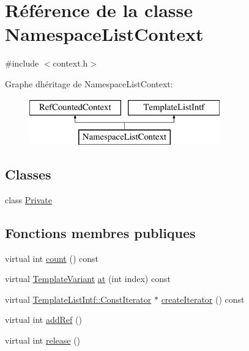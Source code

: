 \hypertarget{class_namespace_list_context}{}\section{Référence de la classe Namespace\+List\+Context}
\label{class_namespace_list_context}


{\ttfamily \#include $<$context.\+h$>$}

Graphe d\textquotesingle{}héritage de Namespace\+List\+Context\+:\begin{figure}[H]
\begin{center}
\leavevmode
\includegraphics[height=2.000000cm]{class_namespace_list_context}
\end{center}
\end{figure}
\subsection*{Classes}
\begin{DoxyCompactItemize}
\item 
class \hyperlink{class_namespace_list_context_1_1_private}{Private}
\end{DoxyCompactItemize}
\subsection*{Fonctions membres publiques}
\begin{DoxyCompactItemize}
\item 
virtual int \hyperlink{class_namespace_list_context_a85fd8893df8ec72e44b199cd4cc5ab50}{count} () const 
\item 
virtual \hyperlink{class_template_variant}{Template\+Variant} \hyperlink{class_namespace_list_context_aa7f97d2508cbc405a1c5acd492b814bc}{at} (int index) const 
\item 
virtual \hyperlink{class_template_list_intf_1_1_const_iterator}{Template\+List\+Intf\+::\+Const\+Iterator} $\ast$ \hyperlink{class_namespace_list_context_a9e82745cefb3f6e52a017c3448a49daf}{create\+Iterator} () const 
\item 
virtual int \hyperlink{class_namespace_list_context_a59c6b6d62a82299a64b36709f6db156f}{add\+Ref} ()
\item 
virtual int \hyperlink{class_namespace_list_context_a8395f4caf4473517e10e0375efe0e419}{release} ()
\end{DoxyCompactItemize}
